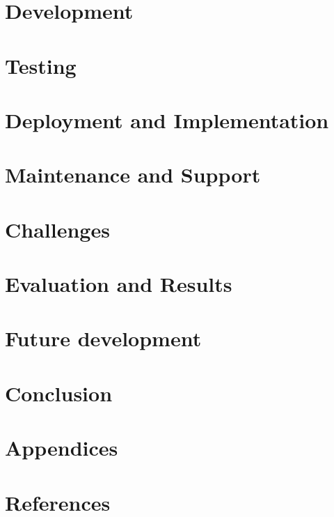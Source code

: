 \documentclass{article}
\begin{document}
\section{Development}

\section{Testing}

\section{Deployment and Implementation}

\section{Maintenance and Support}

\section{Challenges}

\section{Evaluation and Results}

\section{Future development}

\section{Conclusion}

\section{Appendices}

\section{References}
\end{document}
